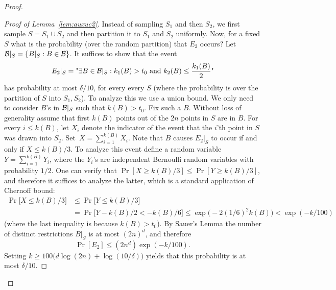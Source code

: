 \documentclass{article}
\newcommand{\B}{{\cal B}}
\newcommand{\samp}{S}
\begin{document}
\begin{proof}
\begin{proof}[Proof of Lemma~\ref{lem:auxuc2}]
Instead of sampling $\samp_1$ and then $\samp_2$,
we first sample $\samp=\samp_1\cup \samp_2$ and 
then partition it to $\samp_1$ and $\samp_2$ uniformly.
Now, for a fixed $\samp$ what is the probability (over the random partition)
that $E_2$ occurs?
Let $\B|_{\samp} = \{B|_{\samp} : B\in\B\}$.
It suffices to show that the event
\[E_2|_{\samp} = \text{"}\exists {B\in\B|_{\samp}}:
  k_1(B)>t_0 \mbox{ and } k_2(B) \leq \frac{k_1(B)}{2}
\text{"}\]
has probability at most $\delta/10$, for every every $\samp$ 
(where the probability is over the partition of $\samp$ into $\samp_1,\samp_2$).
To analyze this we use a union bound. 
We only need to consider $B$'s in $\B|_{\samp}$ such that $k(B) > t_0$.
Fix such a $B$.
Without loss of generality assume that
first $k(B)$ points out of the $2n$
points in $S$ are in $B$. 
For every $i\leq k(B)$,
let $X_i$ denote the indicator of the event
that the $i$'th point in $S$ was drawn into $S_2$.
Set~$X=\sum_{i=1}^{k(B)}X_i$.
Note that $B$ causes $E_2|_{\samp}$ to occur if and only if $X\leq k(B)/3$.
To analyze this event define a random variable $Y=\sum_{i=1}^{k(B)}Y_i$,
where the $Y_i$'s are independent Bernoulli random variables with probability $1/2$.
One can verify that $\Pr[X\geq k(B)/3]\leq \Pr[Y\geq k(B)/3]$,
and therefore it suffices to analyze the latter, 
which is a standard application of Chernoff bound:
\begin{align*}
\Pr\bigl[X\leq k(B)/3\bigr]&\leq 
\Pr\bigl[Y\leq k(B)/3\bigr]\\
&=\Pr\bigl[Y- k(B)/2 < -k(B)/6\bigr]\leq
\exp\bigl(-2(1/6)^2k(B)\bigr) < \exp(-k/100)
\end{align*}
(where the last inequality is because $k(B) > t_0$).
By Sauer's Lemma
the number of distinct restrictions $B|_S$ is at most $(2n)^d$, and therefore 
\[\Pr[E_2]\leq (2n^d)\exp(-k/100).\]
Setting $k\geq 100\bigl(d\log(2n) + \log(10/\delta)\bigr)$ yields
that this probability is at most $\delta/10$.
\end{proof}
\end{proof}
\end{document}
